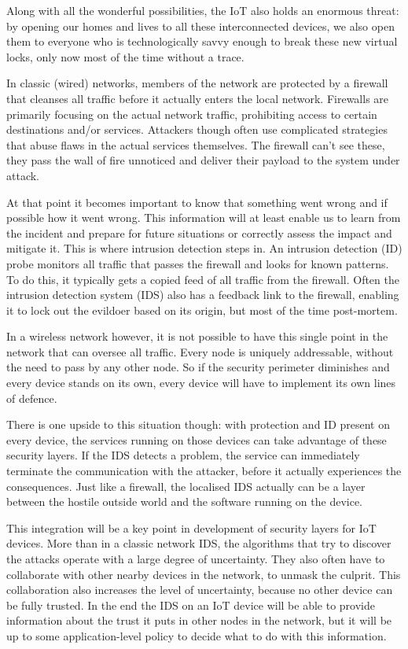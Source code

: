 \documentclass[conference]{IEEEtran}
\begin{document}
Along with all the wonderful possibilities, the IoT also holds an enormous
threat: by opening our homes and lives to all these interconnected devices, we
also open them to everyone who is technologically savvy enough to break these
new virtual locks, only now most of the time without a trace.

In classic (wired) networks, members of the network are protected by a firewall
that cleanses all traffic before it actually enters the local network.
Firewalls are primarily focusing on the actual network traffic, prohibiting
access to certain destinations and/or services. Attackers though often use
complicated strategies that abuse flaws in the actual services themselves. The
firewall can't see these, they pass the wall of fire unnoticed and deliver
their payload to the system under attack.

At that point it becomes important to know that something went wrong and if
possible how it went wrong. This information will at least enable us to learn
from the incident and prepare for future situations or correctly assess the
impact and mitigate it. This is where intrusion detection steps in. An
intrusion detection (ID) probe monitors all traffic that passes the firewall
and looks for known patterns. To do this, it typically gets a copied feed of
all traffic from the firewall. Often the intrusion detection system (IDS) also
has a feedback link to the firewall, enabling it to lock out the evildoer based
on its origin, but most of the time post-mortem.

In a wireless network however, it is not possible to have this single point in
the network that can oversee all traffic. Every node is uniquely addressable,
without the need to pass by any other node. So if the security perimeter
diminishes and every device stands on its own, every device will have to
implement its own lines of defence.

There is one upside to this situation though: with protection and ID present on
every device, the services running on those devices can take advantage of these
security layers. If the IDS detects a problem, the service can immediately
terminate the communication with the attacker, before it actually experiences
the consequences. Just like a firewall, the localised IDS actually can be a
layer between the hostile outside world and the software running on the device.

This integration will be a key point in development of security layers for IoT
devices. More than in a classic network IDS, the algorithms that try to
discover the attacks operate with a large degree of uncertainty. They also
often have to collaborate with other nearby devices in the network, to unmask
the culprit. This collaboration also increases the level of uncertainty,
because no other device can be fully trusted. In the end the IDS on an IoT
device will be able to provide information about the trust it puts in other
nodes in the network, but it will be up to some application-level policy to
decide what to do with this information.
\end{document}
